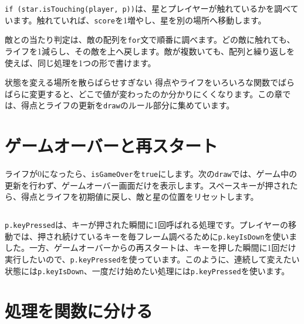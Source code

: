 \begin{listing}[htbp]
\inputminted[firstline=146,lastline=173]{ts}{typescript-p5/listings/chapter15/star-catcher-game.ts}
\caption{\texttt{draw}でゲームのルールを進める（\texttt{chapter15/star-catcher-game.ts}）}
\label{lst:chapter15-draw-rules}
\end{listing}

\texttt{if (star.isTouching(player, p))}は、星とプレイヤーが触れているかを調べています。触れていれば、\texttt{score}を1増やし、星を別の場所へ移動します。

敵との当たり判定は、敵の配列を\texttt{for}文で順番に調べます。どの敵に触れても、ライフを1減らし、その敵を上へ戻します。敵が複数いても、配列と繰り返しを使えば、同じ処理を1つの形で書けます。

\begin{mistakebox}{状態を変える場所を散らばらせすぎない}
得点やライフをいろいろな関数でばらばらに変更すると、どこで値が変わったのか分かりにくくなります。この章では、得点とライフの更新を\texttt{draw}のルール部分に集めています。
\end{mistakebox}

\section{ゲームオーバーと再スタート}

ライフが0になったら、\texttt{isGameOver}を\texttt{true}にします。次の\texttt{draw}では、ゲーム中の更新を行わず、ゲームオーバー画面だけを表示します。スペースキーが押されたら、得点とライフを初期値に戻し、敵と星の位置をリセットします。

\begin{listing}[htbp]
\inputminted[firstline=175,lastline=187]{ts}{typescript-p5/listings/chapter15/star-catcher-game.ts}
\caption{スペースキーでゲームを再スタートする（\texttt{chapter15/star-catcher-game.ts}）}
\label{lst:chapter15-restart}
\end{listing}

\texttt{p.keyPressed}は、キーが押された瞬間に1回呼ばれる処理です。プレイヤーの移動では、押され続けているキーを毎フレーム調べるために\texttt{p.keyIsDown}を使いました。一方、ゲームオーバーからの再スタートは、キーを押した瞬間に1回だけ実行したいので、\texttt{p.keyPressed}を使っています。このように、連続して変えたい状態には\texttt{p.keyIsDown}、一度だけ始めたい処理には\texttt{p.keyPressed}を使います。

\section{処理を関数に分ける}

